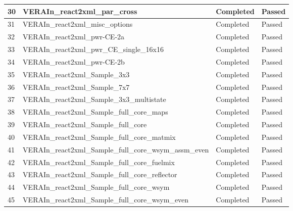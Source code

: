 \begin{longtable}[!ht]{|p{0.75cm}|p{11.25cm}|p{1.6cm}|p{1.1cm}|}
\rowcolor{caslcolor2}\small 30 & \small VERAIn\_react2xml\_par\_cross & \small Completed & \small Passed \\\hline
\rowcolor{caslcolor1}\small 31 & \small VERAIn\_react2xml\_misc\_options & \small Completed & \small Passed \\\hline
\rowcolor{caslcolor2}\small 32 & \small VERAIn\_react2xml\_pwr-CE-2a & \small Completed & \small Passed \\\hline
\rowcolor{caslcolor1}\small 33 & \small VERAIn\_react2xml\_pwr\_CE\_single\_16x16 & \small Completed & \small Passed \\\hline
\rowcolor{caslcolor2}\small 34 & \small VERAIn\_react2xml\_pwr-CE-2b & \small Completed & \small Passed \\\hline
\rowcolor{caslcolor1}\small 35 & \small VERAIn\_react2xml\_Sample\_3x3 & \small Completed & \small Passed \\\hline
\rowcolor{caslcolor2}\small 36 & \small VERAIn\_react2xml\_Sample\_7x7 & \small Completed & \small Passed \\\hline
\rowcolor{caslcolor1}\small 37 & \small VERAIn\_react2xml\_Sample\_3x3\_multistate & \small Completed & \small Passed \\\hline
\rowcolor{caslcolor2}\small 38 & \small VERAIn\_react2xml\_Sample\_full\_core\_maps & \small Completed & \small Passed \\\hline
\rowcolor{caslcolor1}\small 39 & \small VERAIn\_react2xml\_Sample\_full\_core & \small Completed & \small Passed \\\hline
\rowcolor{caslcolor2}\small 40 & \small VERAIn\_react2xml\_Sample\_full\_core\_matmix & \small Completed & \small Passed \\\hline
\rowcolor{caslcolor1}\small 41 & \small VERAIn\_react2xml\_Sample\_full\_core\_wsym\_assm\_even & \small Completed & \small Passed \\\hline
\rowcolor{caslcolor2}\small 42 & \small VERAIn\_react2xml\_Sample\_full\_core\_fuelmix & \small Completed & \small Passed \\\hline
\rowcolor{caslcolor1}\small 43 & \small VERAIn\_react2xml\_Sample\_full\_core\_reflector & \small Completed & \small Passed \\\hline
\rowcolor{caslcolor2}\small 44 & \small VERAIn\_react2xml\_Sample\_full\_core\_wsym & \small Completed & \small Passed \\\hline
\rowcolor{caslcolor1}\small 45 & \small VERAIn\_react2xml\_Sample\_full\_core\_wsym\_even & \small Completed & \small Passed \\\hline

\end{longtable}
